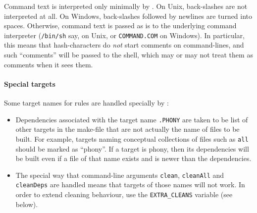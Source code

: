 Command text is interpreted only minimally by \holmake.  On Unix,
back-slashes are not interpreted at all.  On Windows, back-slashes
followed by newlines are turned into spaces. Otherwise, command text
is passed as is to the underlying command interpreter
(\texttt{/bin/sh} say, on Unix, or \texttt{COMMAND.COM} on Windows).
In particular, this means that hash-characters do \emph{not} start
comments on command-lines, and such ``comments'' will be passed to the
shell, which may or may not treat them as comments when it sees them.

\paragraph{Special targets}
Some target names for rules are handled specially by \holmake{}:
\begin{itemize}
\item Dependencies associated with the target name \texttt{.PHONY} are taken to be list of other targets in the make-file that are not actually the name of files to be built.
For example, targets naming conceptual collections of files such as \texttt{all} should be marked as ``phony''.
If a target is phony, then its dependencies will be built even if a file of that name exists and is newer than the dependencies.
\item The special way that command-line arguments \texttt{clean}, \texttt{cleanAll} and \texttt{cleanDeps} are handled means that targets of those names will not work.
In order to extend cleaning behaviour, use the \texttt{EXTRA\_CLEANS} variable (see below).
\end{itemize}
